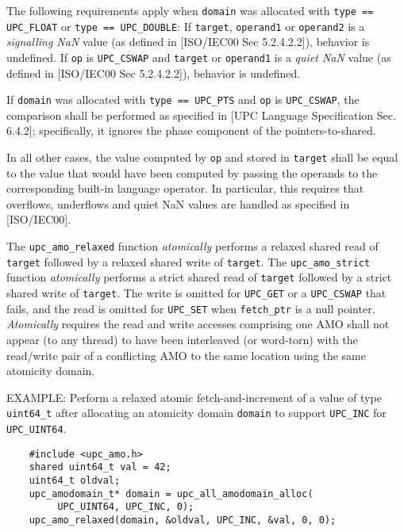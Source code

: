 \np The following requirements apply when {\tt domain} was allocated 
    with {\tt type == UPC\_FLOAT} or {\tt type == UPC\_DOUBLE}:
    If {\tt *target}, {\tt *operand1} or {\tt *operand2} is a {\em signalling NaN} value 
    (as defined in [ISO/IEC00 Sec 5.2.4.2.2]), behavior is undefined.
    If {\tt op} is {\tt UPC\_CSWAP} and {\tt *target} or {\tt *operand1} is a {\em quiet NaN} value 
    (as defined in [ISO/IEC00 Sec 5.2.4.2.2]), behavior is undefined.

\np If {\tt domain} was allocated with {\tt type == UPC\_PTS} and {\tt op} is {\tt UPC\_CSWAP},
    the comparison shall be performed as specified in [UPC Language Specification Sec. 6.4.2];
    specifically, it ignores the phase component of the pointers-to-shared.

\np In all other cases, the value computed by {\tt op} and stored in {\tt *target} 
    shall be equal to the value that would have been computed by passing the operands 
    to the corresponding built-in language operator. In particular, this requires that
    overflows, underflows and quiet NaN values are handled as specified in [ISO/IEC00].

\np The {\tt upc\_amo\_relaxed} function {\em atomically} performs a relaxed shared read of {\tt *target} 
    followed by a relaxed shared write of {\tt *target}. 
    The {\tt upc\_amo\_strict} function {\em atomically} performs a strict shared read of {\tt *target} 
    followed by a strict shared write of {\tt *target}. The write is omitted for {\tt UPC\_GET} 
    or a {\tt UPC\_CSWAP} that fails, 
    and the read is omitted for {\tt UPC\_SET} when {\tt fetch\_ptr} is a null pointer.
    {\em Atomically} requires the read and write accesses comprising one AMO shall not appear (to any thread) 
    to have been interleaved (or word-torn) with the read/write pair of a conflicting AMO to the same location
    using the same atomicity domain.

\np EXAMPLE: Perform a relaxed atomic fetch-and-increment of a value of type
    {\tt uint64\_t} after allocating an atomicity domain {\tt domain} to
    support {\tt UPC\_INC} for {\tt UPC\_UINT64}.
\begin{verbatim}
    #include <upc_amo.h>
    shared uint64_t val = 42;
    uint64_t oldval;
    upc_amodomain_t* domain = upc_all_amodomain_alloc(
         UPC_UINT64, UPC_INC, 0);
    upc_amo_relaxed(domain, &oldval, UPC_INC, &val, 0, 0);
\end{verbatim}
\vfill

